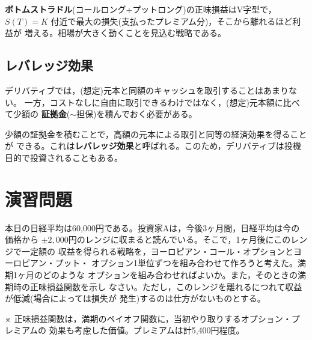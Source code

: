 \textbf{ボトムストラドル}(コールロング+プットロング)の正味損益はV字型で，
$S(T)=K$ 付近で最大の損失(支払ったプレミアム分)，そこから離れるほど利益が
増える。相場が大きく動くことを見込む戦略である。

\subsection{レバレッジ効果}

デリバティブでは，(想定)元本と同額のキャッシュを取引することはあまりない。
一方，コストなしに自由に取引できるわけではなく，(想定)元本額に比べて少額の
\textbf{証拠金}($\sim$担保)を積んでおく必要がある。

\begin{keypoint}[レバレッジ効果]
少額の証拠金を積むことで，高額の元本による取引と同等の経済効果を得ることが
できる。これは\textbf{レバレッジ効果}と呼ばれる。このため，デリバティブは投機
目的で投資されることもある。
\end{keypoint}

\section{演習問題}

\begin{exercise}[問題1]
本日の日経平均は60,000円である。投資家Aは，今後3ヶ月間，日経平均は今の価格から
$\pm 2{,}000$円のレンジに収まると読んでいる。そこで，1ヶ月後にこのレンジで一定額の
収益を得られる戦略を，ヨーロピアン・コール・オプションとヨーロピアン・プット・
オプション1単位ずつを組み合わせて作ろうと考えた。満期1ヶ月のどのような
オプションを組み合わせればよいか。また，そのときの満期時の正味損益関数を示し
なさい。ただし，このレンジを離れるにつれて収益が低減(場合によっては損失が
発生)するのは仕方がないものとする。

※ 正味損益関数は，満期のペイオフ関数に，当初やり取りするオプション・プレミアムの
効果も考慮した価値。プレミアムは計5,400円程度。
\end{exercise}

